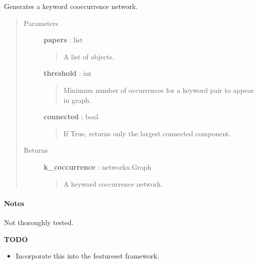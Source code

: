 \documentclass[letterpaper,10pt,english]{sphinxmanual}
\begin{document}
\begin{fulllineitems}
\label{tethne.networks.features:tethne.networks.features.keyword_cooccurrence}
Generates a keyword cooccurrence network.
\begin{quote}\begin{description}
\item[{Parameters}] \leavevmode
\textbf{papers} : list
\begin{quote}

A list of {\hyperref[tethne.classes.paper:tethne.classes.paper.Paper]{}} objects.
\end{quote}

\textbf{threshold} : int
\begin{quote}

Minimum number of occurrences for a keyword pair to appear in graph.
\end{quote}

\textbf{connected} : bool
\begin{quote}

If True, returns only the largest connected component.
\end{quote}

\item[{Returns}] \leavevmode
\textbf{k\_coccurrence} :  networkx.Graph
\begin{quote}

A keyword coccurrence network.
\end{quote}

\end{description}\end{quote}
\paragraph{Notes}

Not thoroughly tested.

\textbf{TODO}
\begin{itemize}
\item {} 
Incorporate this into the featureset framework.

\end{itemize}

\end{fulllineitems}

\end{document}
